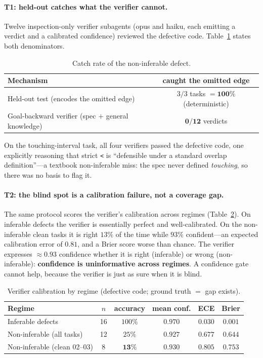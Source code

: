\documentclass[11pt]{article}
\newcommand{\code}[1]{\texttt{#1}}
\begin{document}
\paragraph{T1: held-out catches what the verifier cannot.}
Twelve inspection-only verifier subagents (opus and haiku, each emitting a verdict and a calibrated
confidence) reviewed the defective code. Table~\ref{tab:t1} states both denominators.

\begin{table}[h]
\centering
\caption{Catch rate of the non-inferable defect.}
\label{tab:t1}
\begin{tabular}{lc}
\toprule
\textbf{Mechanism} & \textbf{caught the omitted edge} \\
\midrule
Held-out test (encodes the omitted edge) & $3/3$ tasks $=\mathbf{100\%}$ (deterministic) \\
Goal-backward verifier (spec $+$ general knowledge) & $\mathbf{0/12}$ verdicts \\
\bottomrule
\end{tabular}
\end{table}

On the touching-interval task, all four verifiers passed the defective code, one explicitly reasoning
that strict \code{<} is ``defensible under a standard overlap definition''---a textbook non-inferable
miss: the spec never defined \emph{touching}, so there was no basis to flag it.

\paragraph{T2: the blind spot is a calibration failure, not a coverage gap.}
The same protocol scores the verifier's calibration across regimes (Table~\ref{tab:t2}). On inferable
defects the verifier is essentially perfect and well-calibrated. On the non-inferable clean tasks it
is right $13\%$ of the time while $93\%$ confident---an expected calibration error of $0.81$, and a
Brier score worse than chance. The verifier expresses $\approx\!0.93$ confidence whether it is right
(inferable) or wrong (non-inferable): \textbf{confidence is uninformative across regimes}. A
confidence gate cannot help, because the verifier is just as sure when it is blind.

\begin{table}[h]
\centering
\caption{Verifier calibration by regime (defective code; ground truth $=$ gap exists).}
\label{tab:t2}
\begin{tabular}{lccccc}
\toprule
\textbf{Regime} & $n$ & \textbf{accuracy} & \textbf{mean conf.} & \textbf{ECE} & \textbf{Brier} \\
\midrule
Inferable defects            & 16 & $100\%$ & $0.970$ & $\mathbf{0.030}$ & $0.001$ \\
Non-inferable (all tasks)    & 12 & $25\%$  & $0.927$ & $0.677$ & $0.644$ \\
Non-inferable (clean 02--03) & 8  & $\mathbf{13\%}$ & $0.930$ & $\mathbf{0.805}$ & $0.753$ \\
\bottomrule
\end{tabular}
\end{table}
\end{document}
